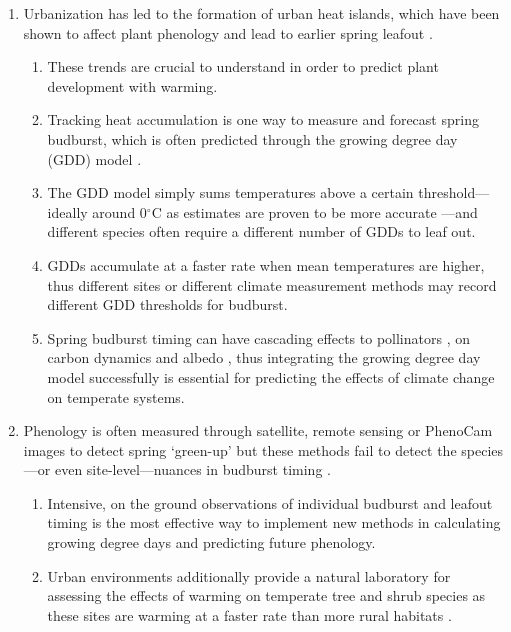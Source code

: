 \documentclass{article}\usepackage[]{graphicx}\usepackage[]{color}
\begin{document}
\begin{enumerate}
\item Urbanization has led to the formation of urban heat islands, which have been shown to affect plant phenology and lead to earlier spring leafout \citep{Meng2020}. 
  \begin{enumerate}
  \item These trends are crucial to understand in order to predict plant development with warming. 
  \item Tracking heat accumulation is one way to measure and forecast spring budburst, which is often predicted through the growing degree day (GDD) model \citep{Cook2012,Crimmins2020,Phillimore2013,Schwartz2006,Vitasse2011}.
  \item The GDD model simply sums temperatures above a certain threshold---ideally around 0$^{\circ}$C as estimates are proven to be more accurate \citep{Man2010}---and different species often require a different number of GDDs to leaf out. 
  \item GDDs accumulate at a faster rate when mean temperatures are higher, thus different sites or different climate measurement methods may record different GDD thresholds for budburst. 
  \item Spring budburst timing can have cascading effects to pollinators \citep{Boggs2012, Pardee2017}, on carbon dynamics \citep{Richardson2013} and albedo \citep{Williamson2016}, thus integrating the growing degree day model successfully is essential for predicting the effects of climate change on temperate systems. 
  \end{enumerate}

\item Phenology is often measured through satellite, remote sensing or PhenoCam images to detect spring `green-up' \citep{Meng2020, Liu2018, Richardson2015} but these methods fail to detect the species---or even site-level---nuances in budburst timing \citep{Elmendorf2019}.
  \begin{enumerate}
  \item Intensive, on the ground observations of individual budburst and leafout timing is the most effective way to implement new methods in calculating growing degree days and predicting future phenology. 
  \item Urban environments additionally provide a natural laboratory for assessing the effects of warming on temperate tree and shrub species as these sites are warming at a faster rate than more rural habitats \citep{Pickett2011, Grimm2008}.
  \end{enumerate}
  

\end{enumerate}
\end{document}
